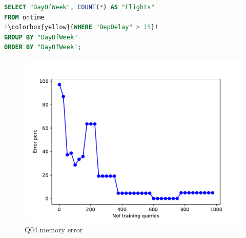 \begin{frame}[fragile]
\begin{lstlisting}[basicstyle=\ttfamily\footnotesize, language=SQL,escapechar=!]
SELECT "DayOfWeek", COUNT(*) AS "Flights"
FROM ontime
!\colorbox{yellow}{WHERE "DepDelay" > 15}!
GROUP BY "DayOfWeek"
ORDER BY "DayOfWeek";
\end{lstlisting}

	\begin{figure}[!htb]
		\centering
	  \includegraphics[scale=0.45]{../figs/airtraffic/airtraffic_q04_memerror.pdf}
	  \caption{Q04 memory error}
	    \label{fig:mem04}
	\end{figure}
\end{frame}


